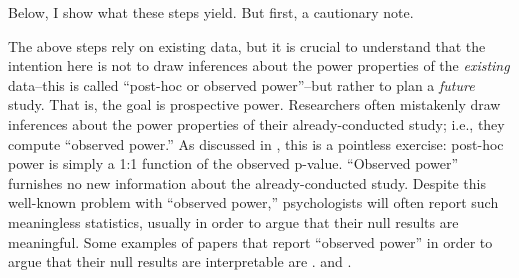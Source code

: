 \documentclass{ar-1col}\usepackage[]{graphicx}\usepackage[]{color}
\begin{document}
Below, I show what these steps yield. But first, a cautionary note.
\begin{marginnote}[]
\end{marginnote}
The above steps rely on existing data, but it is crucial to understand that the intention here is not to draw inferences about the power properties of the \textit{existing} data--this is called ``post-hoc or observed power''--but rather to plan a \textit{future} study. That is, the goal is prospective power. Researchers often mistakenly draw inferences about the power properties of their already-conducted study; i.e., they compute ``observed power.'' As discussed in \citet{hoenigheisey}, this is a pointless exercise: post-hoc power is simply a 1:1 function of the observed p-value. ``Observed power'' furnishes no new information about the already-conducted study.
Despite this well-known problem with ``observed power,'' psychologists will often report such meaningless statistics, usually in order to argue that their null results are meaningful. Some examples of papers that report ``observed power'' in order to argue that their null results are interpretable are \citet{gordon04}. and \citet{berman2009search}.

 



\end{document}
